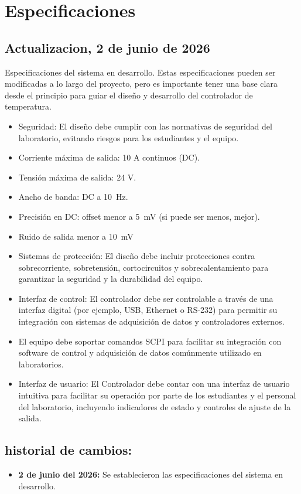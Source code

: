 \chapter[Especificaciones]{Especificaciones}
\label{cp:especificaciones}
{
\section{Actualizacion, 2 de junio de 2026}
Especificaciones del sistema en desarrollo. Estas especificaciones pueden ser modificadas a lo largo del proyecto, pero es importante tener una base clara desde el principio para guiar el diseño y desarrollo del controlador de temperatura.

\begin{itemize}
    \item Seguridad: El diseño debe cumplir con las normativas de seguridad del laboratorio, evitando riesgos para los estudiantes y el equipo.
    \item Corriente máxima de salida: 10 A continuos (DC).
    \item Tensión máxima de salida: 24 V.
    \item Ancho de banda: DC a \qty{10}{\hertz}.
    \item Precisión en DC: offset menor a \qty{5}{\milli\volt} (si puede ser menos, mejor).
    \item Ruido de salida menor a \qty{10}{\milli\volt}
    \item Sistemas de protección: El diseño debe incluir protecciones contra sobrecorriente, sobretensión, cortocircuitos y sobrecalentamiento para garantizar la seguridad y la durabilidad del equipo.
    \item Interfaz de control: El controlador debe ser controlable a través de una interfaz digital (por ejemplo, USB, Ethernet o RS-232) para permitir su integración con sistemas de adquisición de datos y controladores externos.
    \item El equipo debe soportar comandos SCPI para facilitar su integración con software de control y adquisición de datos comúnmente utilizado en laboratorios.
    \item Interfaz de usuario: El Controlador debe contar con una interfaz de usuario intuitiva para facilitar su operación por parte de los estudiantes y el personal del laboratorio, incluyendo indicadores de estado y controles de ajuste de la salida.
\end{itemize}

\section{historial de cambios:}
\begin{itemize}
    \item \textbf{ 2 de junio del 2026:} Se establecieron las especificaciones del sistema en desarrollo. 
\end{itemize}

}